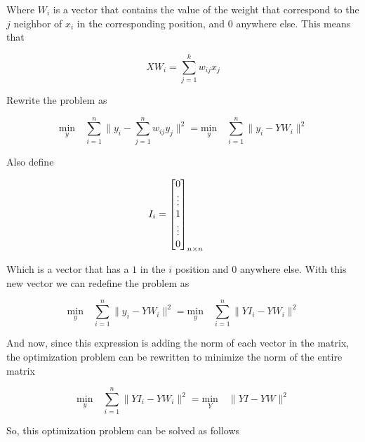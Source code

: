\documentclass[12pt,journal]{IEEEtran}
\begin{document}
    Where $W_i$ is a vector that contains the value of the weight that correspond
    to the $j$ neighbor of $x_i$ in the corresponding position, and 0 anywhere
    else. This means that 

    \begin{equation*}
        X W_i = \sum_{j=1}^k w_{ij} x_j
    \end{equation*}

    Rewrite the problem as

    \begin{equation*}
            \underset{y}{\text{min}} \quad \sum_{i=1}^n \lVert y_i - \sum_{j=1}^n w_{ij} y_j \rVert^2
            =
            \underset{y}{\text{min}} \quad \sum_{i=1}^n \lVert y_i - Y W_i \rVert^2
    \end{equation*}

    Also define 

    \[
        I_i = 
        \begin{bmatrix}
            0 \\
            \vdots \\ 
            1 \\
            \vdots \\ 
            0 \\
        \end{bmatrix}_{n \times n}
        \hspace{0.5cm}
    \]

    Which is a vector that has a $1$ in the $i$ position and $0$ anywhere else.
    With this new vector we can redefine the problem as

    \begin{equation*}
            \underset{y}{\text{min}} \quad \sum_{i=1}^n \lVert y_i - Y W_i \rVert^2
            =
            \underset{y}{\text{min}} \quad \sum_{i=1}^n \lVert YI_i - Y W_i \rVert^2
    \end{equation*}

    And now, since this expression is adding the norm of each vector in the
    matrix, the optimization problem can be rewritten to minimize the norm of
    the entire matrix

    \begin{equation*}
            \underset{y}{\text{min}} \quad \sum_{i=1}^n \lVert YI_i - Y W_i \rVert^2
            =
            \underset{Y}{\text{min}} \quad \lVert YI - Y W \rVert^2
    \end{equation*}

    So, this optimization problem can be solved as follows
\end{document}
